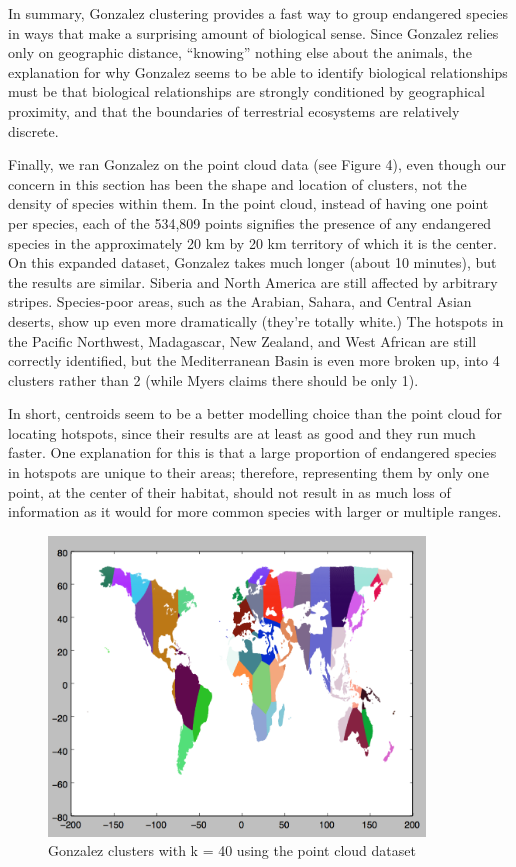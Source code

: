 \documentclass[11pt, fullpage,letterpaper]{article}
\begin{document}
		In summary, Gonzalez clustering provides a fast way to group endangered species in ways that make a surprising amount of biological sense. Since Gonzalez relies only on geographic distance, ``knowing'' nothing else about the animals, the explanation for why Gonzalez seems to be able to identify biological relationships must be that biological relationships are strongly conditioned by geographical proximity, and that the boundaries of terrestrial ecosystems are relatively discrete.
		
		Finally, we ran Gonzalez on the point cloud data (see Figure 4), even though our concern in this section has been the shape and location of clusters, not the density of species within them. In the point cloud, instead of having one point per species, each of the 534,809 points signifies the presence of any endangered species in the approximately 20 km by 20 km territory of which it is the center. On this expanded dataset, Gonzalez takes much longer (about 10 minutes), but the results are similar. Siberia and North America are still affected by arbitrary stripes. Species-poor areas, such as the Arabian, Sahara, and Central Asian deserts, show up even more dramatically (they're totally white.) The hotspots in the Pacific Northwest, Madagascar, New Zealand, and West African are still correctly identified, but the Mediterranean Basin is even more broken up, into 4 clusters rather than 2 (while Myers claims there should be only 1).
		
		In short, centroids seem to be a better modelling choice than the point cloud for locating hotspots, since their results are at least as good and they run much faster. One explanation for this is that a large proportion of endangered species in hotspots are unique to their areas; therefore, representing them by only one point, at the center of their habitat, should not result in as much loss of information as it would for more common species with larger or multiple ranges. 
		
		\begin{figure}[H]
			\centering
			\includegraphics[width=10cm]{gonzalezPointCloud.png}
			\caption{Gonzalez clusters with k = 40 using the point cloud dataset}
		\end{figure}
\end{document}
